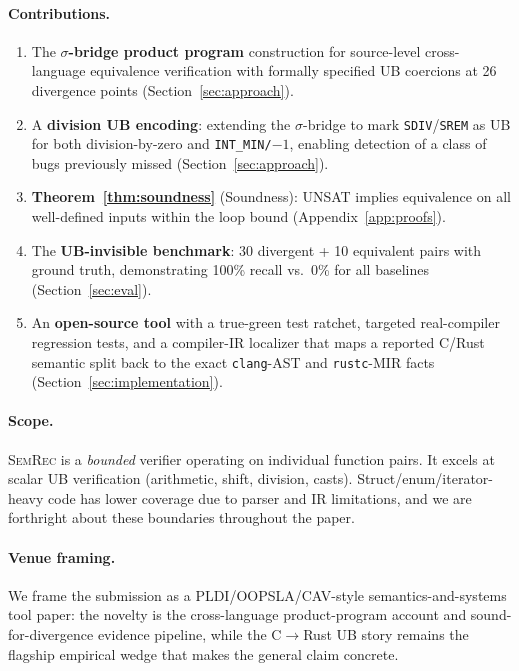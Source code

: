 \documentclass[10pt,a4paper]{article}
\begin{document}
\paragraph{Contributions.}
\begin{enumerate}[leftmargin=*]
  \item The \textbf{$\sigma$-bridge product program} construction for
    source-level cross-language equivalence verification with formally
    specified UB coercions at 26 divergence points
    (Section~\ref{sec:approach}).
  \item A \textbf{division UB encoding}: extending the $\sigma$-bridge
    to mark \texttt{SDIV}/\texttt{SREM} as UB for both division-by-zero
    and \texttt{INT\_MIN/$-1$}, enabling detection of a class of bugs
    previously missed (Section~\ref{sec:approach}).
  \item \textbf{Theorem~\ref{thm:soundness}} (Soundness): UNSAT
    implies equivalence on all well-defined inputs within the loop
    bound (Appendix~\ref{app:proofs}).
  \item The \textbf{UB-invisible benchmark}: 30 divergent + 10
    equivalent pairs with ground truth, demonstrating 100\% recall
    vs.\ 0\% for all baselines (Section~\ref{sec:eval}).
  \item An \textbf{open-source tool} with a true-green test ratchet,
    targeted real-compiler regression tests, and a compiler-IR localizer that
    maps a reported C/Rust semantic split back to the exact
    \texttt{clang}-AST and \texttt{rustc}-MIR facts
    (Section~\ref{sec:implementation}).
\end{enumerate}

\paragraph{Scope.}
\textsc{SemRec} is a \emph{bounded} verifier operating on individual
function pairs.  It excels at scalar UB verification (arithmetic,
shift, division, casts).  Struct/enum/iterator-heavy code has lower
coverage due to parser and IR limitations, and we are forthright
about these boundaries throughout the paper.

\paragraph{Venue framing.}
We frame the submission as a PLDI/OOPSLA/CAV-style semantics-and-systems tool
paper: the novelty is the cross-language product-program account and
sound-for-divergence evidence pipeline, while the C$\to$Rust UB story remains the
flagship empirical wedge that makes the general claim concrete.
\end{document}
